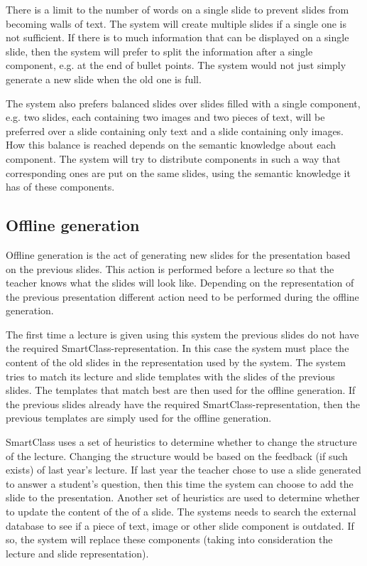 \documentclass[11pt]{article}
\begin{document}
There is a limit to the number of words on a single slide to prevent slides from becoming walls of text. The system will create multiple slides if a single one is not sufficient. If there is to much information that can be displayed on a single slide, then the system will prefer to split the information after a single component, e.g. at the end of bullet points. The system would not just simply generate a new slide when the old one is full. 

The system also prefers balanced slides over slides filled with a single component, e.g. two slides, each containing two images and two pieces of text, will be preferred over a slide containing only text and a slide containing only images. How this balance is reached depends on the semantic knowledge about each component. The system will try to distribute components in such a way that corresponding ones are put on the same slides, using the semantic knowledge it has of these components. 

\subsection{Offline generation}
Offline generation is the act of generating new slides for the presentation based on the previous slides. This action is performed before a lecture so that the teacher knows what the slides will look like. Depending on the representation of the previous presentation different action need to be performed during the offline generation. 

The first time a lecture is given using this system the previous slides do not have the required SmartClass-representation. In this case the system must place the content of the old slides in the representation used by the system. The system tries to match its lecture and slide templates with the slides of the previous slides. The templates that match best are then used for the offline generation. If the previous slides already have the required SmartClass-representation, then the previous templates are simply used for the offline generation.

SmartClass uses a set of heuristics to determine whether to change the structure of the lecture. Changing the structure would be based on the feedback (if such exists) of last year's lecture. If last year the teacher chose to use a slide generated to answer a student's question, then this time the system can choose to add the slide to the presentation. Another set of heuristics are used to determine whether to update the content of the of a slide. The systems needs to search the external database to see if a piece of text, image or other slide component is outdated. If so, the system will replace these components (taking into consideration the lecture and slide representation).
\end{document}
